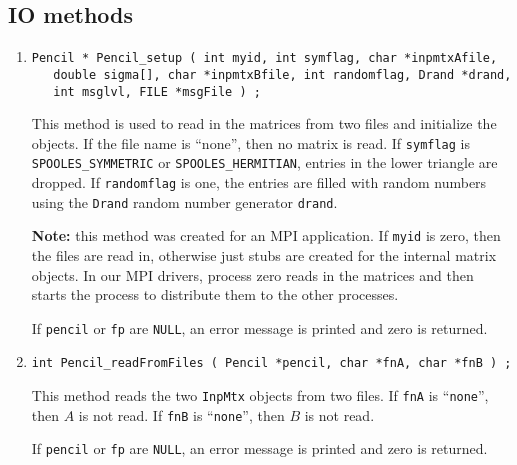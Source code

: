 \par
\subsection{IO methods}
\label{subsection:Pencil:proto:IO}
\par
\begin{enumerate}
\item
\begin{verbatim}
Pencil * Pencil_setup ( int myid, int symflag, char *inpmtxAfile, 
   double sigma[], char *inpmtxBfile, int randomflag, Drand *drand,
   int msglvl, FILE *msgFile ) ;
\end{verbatim}
\par
This method is used to read in the matrices from two files and
initialize the objects.
If the file name is ``none'', then no matrix is read.
If {\tt symflag} is {\tt SPOOLES\_SYMMETRIC} or
{\tt SPOOLES\_HERMITIAN}, entries in the lower triangle are dropped.
If {\tt randomflag} is one, the entries are filled with random
numbers using the {\tt Drand} random number generator {\tt drand}.
\par
{\bf Note:} this method was created for an MPI application.
If {\tt myid} is zero, then the files are read in, otherwise
just stubs are created for the internal matrix objects.
In our MPI drivers, process zero reads in the matrices and then
starts the process to distribute them to the other processes.
\par {}
If {\tt pencil} or {\tt fp} are {\tt NULL},
an error message is printed and zero is returned.
\item
\begin{verbatim}
int Pencil_readFromFiles ( Pencil *pencil, char *fnA, char *fnB ) ;
\end{verbatim}
\par
This method reads the two {\tt InpMtx} objects from two files.
If {\tt fnA} is ``{\tt none}'', then $A$ is not read.
If {\tt fnB} is ``{\tt none}'', then $B$ is not read.
\par {}
If {\tt pencil} or {\tt fp} are {\tt NULL},
an error message is printed and zero is returned.

\end{enumerate}
